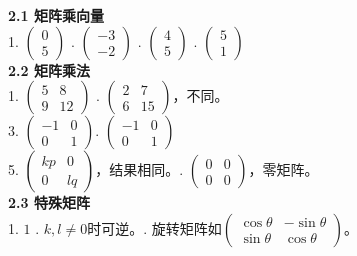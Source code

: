
\noindent\textbf{2.1 矩阵乘向量}\\
1. $\begin{pmatrix}0\\5\end{pmatrix}$ . $\begin{pmatrix}-3\\-2\end{pmatrix}$ . $\begin{pmatrix}4\\5\end{pmatrix}$ . $\begin{pmatrix}5\\1\end{pmatrix}$\\

\noindent\textbf{2.2 矩阵乘法}\\
1. $\begin{pmatrix}5&8\\9&12\end{pmatrix}$ . $\begin{pmatrix}2&7\\6&15\end{pmatrix}$，不同。\\
3. $\begin{pmatrix}-1&0\\0&1\end{pmatrix}$. $\begin{pmatrix}-1&0\\0&1\end{pmatrix}$\\
5. $\begin{pmatrix}kp&0\\0&lq\end{pmatrix}$，结果相同。. $\begin{pmatrix}0&0\\0&0\end{pmatrix}$，零矩阵。\\

\noindent\textbf{2.3 特殊矩阵}\\
1. $1$ . $k,l\neq0$时可逆。. 旋转矩阵如$\begin{pmatrix}\cos\theta&-\sin\theta\\\sin\theta&\cos\theta\end{pmatrix}$。\\

